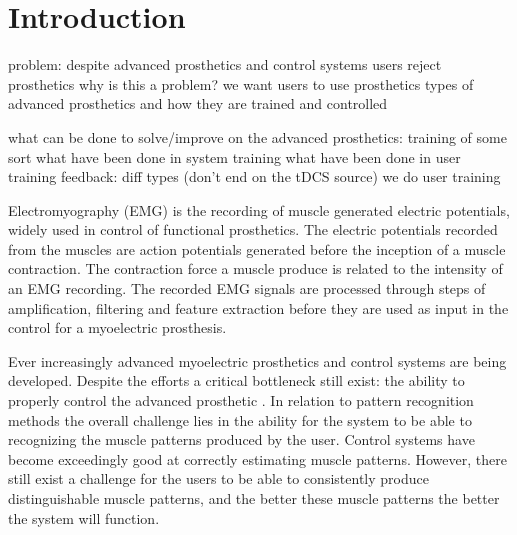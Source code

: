 
\section{Introduction}			%


problem: despite advanced prosthetics and control systems users reject prosthetics
why is this a problem? we want users to use prosthetics
types of advanced prosthetics and how they are trained and controlled


what can be done to solve/improve on the advanced prosthetics: training of some sort
what have been done in system training
what have been done in user training
feedback: diff types (don't end on the tDCS source)  
we do user training





Electromyography (EMG) is the recording of muscle generated electric potentials, widely used in control of functional prosthetics. The electric potentials recorded from the muscles are action potentials generated before the inception of a muscle contraction. The contraction force a muscle produce is related to the intensity of an EMG recording. The recorded EMG signals are processed through steps of amplification, filtering and feature extraction before they are used as input in the control for a myoelectric prosthesis. \cite{Cram2012, Fougner2012} %


Ever increasingly advanced myoelectric prosthetics and control systems are being developed. Despite the efforts a critical bottleneck still exist: the ability to properly control the advanced prosthetic \cite{Hwang2017}. In relation to pattern recognition methods the overall challenge lies in the ability for the system to be able to recognizing the muscle patterns produced by the user. Control systems have become exceedingly good at correctly estimating muscle patterns. However, there still exist a challenge for the users to be able to consistently produce distinguishable muscle patterns, and the better these muscle patterns the better the system will function. \cite{Powell2014}

